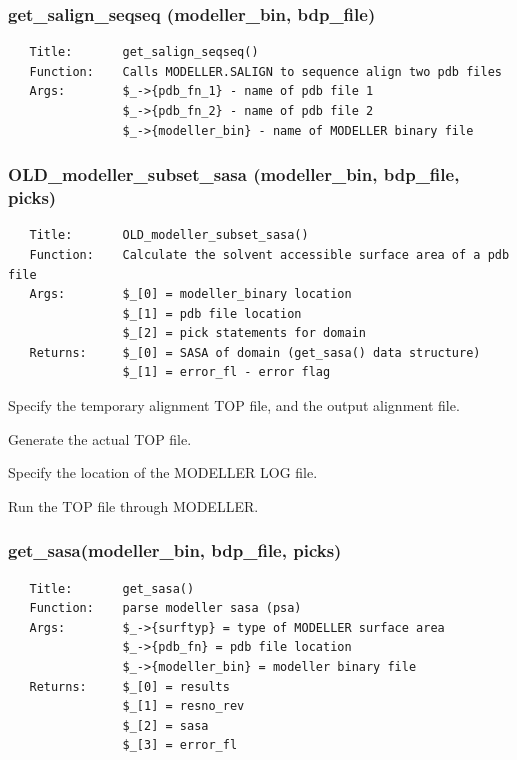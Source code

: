 \documentclass{article}
\begin{document}
\subsubsection*{get\_salign\_seqseq (modeller\_bin, bdp\_file)\label{pibase::modeller_get_salign_seqseq_modeller_bin_bdp_file_}}
\begin{verbatim}
   Title:       get_salign_seqseq()
   Function:    Calls MODELLER.SALIGN to sequence align two pdb files
   Args:        $_->{pdb_fn_1} - name of pdb file 1
                $_->{pdb_fn_2} - name of pdb file 2
                $_->{modeller_bin} - name of MODELLER binary file
\end{verbatim}
\subsubsection*{OLD\_modeller\_subset\_sasa (modeller\_bin, bdp\_file, picks)\label{pibase::modeller_OLD_modeller_subset_sasa_modeller_bin_bdp_file_picks_}}
\begin{verbatim}
   Title:       OLD_modeller_subset_sasa()
   Function:    Calculate the solvent accessible surface area of a pdb file
   Args:        $_[0] = modeller_binary location
                $_[1] = pdb file location
                $_[2] = pick statements for domain
   Returns:     $_[0] = SASA of domain (get_sasa() data structure)
                $_[1] = error_fl - error flag
\end{verbatim}


Specify the temporary alignment TOP file, and the output alignment file.



Generate the actual TOP file.



Specify the location of the MODELLER LOG file.



Run the TOP file through MODELLER.

\subsubsection*{get\_sasa(modeller\_bin, bdp\_file, picks)\label{pibase::modeller_get_sasa_modeller_bin_bdp_file_picks_}}
\begin{verbatim}
   Title:       get_sasa()
   Function:    parse modeller sasa (psa)
   Args:        $_->{surftyp} = type of MODELLER surface area
                $_->{pdb_fn} = pdb file location
                $_->{modeller_bin} = modeller binary file
   Returns:     $_[0] = results
                $_[1] = resno_rev
                $_[2] = sasa
                $_[3] = error_fl
\end{verbatim}
\end{document}
